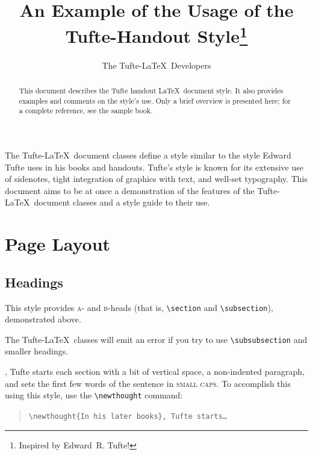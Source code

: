 \documentclass{tufte-handout}
\title{An Example of the Usage of the Tufte-Handout Style\thanks{Inspired by Edward~R. Tufte!}}
\author[The Tufte-LaTeX Developers]{The Tufte-\LaTeX\ Developers}
\newcommand{\doccmd}[1]{\texttt{\textbackslash#1}}%
\newenvironment{docspec}{\begin{quote}\noindent}{\end{quote}}%
\begin{document}
\maketitle%

\begin{abstract}
\noindent
This document describes the Tufte handout \LaTeX\ document style.
It also provides examples and comments on the style's use.
Only a brief overview is presented here;
for a complete reference, see the sample book.
\end{abstract}


The Tufte-\LaTeX\ document classes define a style similar to the
style Edward Tufte uses in his books and handouts.  Tufte's style is known
for its extensive use of sidenotes, tight integration of graphics with
text, and well-set typography.  This document aims to be at once a
demonstration of the features of the Tufte-\LaTeX\ document classes
and a style guide to their use.

\section{Page Layout}\label{sec:page-layout}
\subsection{Headings}\label{sec:headings}
This style provides \textsc{a}- and \textsc{b}-heads (that is,
\Verb|\section| and \Verb|\subsection|), demonstrated above.

The Tufte-\LaTeX\ classes will emit an error if you try to use
\linebreak\Verb|\subsubsection| and smaller headings.

,\cite{Tufte2006} Tufte
starts each section with a bit of vertical space, a non-indented paragraph,
and sets the first few words of the sentence in \textsc{small caps}.  To
accomplish this using this style, use the \Verb|\newthought| command:  
\begin{docspec}
  \doccmd{newthought\{In his later books\}, Tufte starts\ldots}
\end{docspec}
\end{document}
